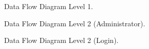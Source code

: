 \documentclass[11pt]{report}
\begin{document}
\begin{figure}[H]
	\caption{Data Flow Diagram Level 1.}
\end{figure}
\begin{figure}[H]
	\caption{Data Flow Diagram Level 2 (Administrator).}
\end{figure}
\begin{figure}[H]
	\caption{Data Flow Diagram Level 2 (Login).}
\end{figure}
\end{document}
